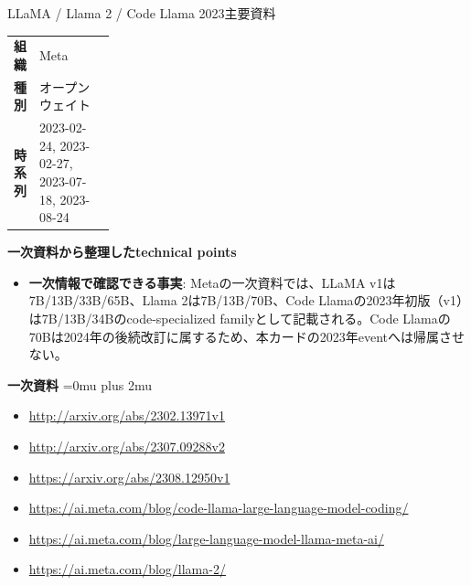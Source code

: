\begin{technicalnote}{LLaMA / Llama 2 / Code Llama 2023}{主要資料}
\begingroup
\begin{tabularx}{\linewidth}{@{}>{\bfseries}p{0.22\linewidth}X@{}}
組織 & Meta \\
種別 & オープンウェイト \\
時系列 & 2023-02-24, 2023-02-27, 2023-07-18, 2023-08-24 \\
\end{tabularx}
\smallskip
{\bfseries 一次資料から整理したtechnical points}
\begin{itemize}[leftmargin=1.5em,itemsep=0.35em]
\item \textbf{一次情報で確認できる事実}: Metaの一次資料では、LLaMA v1は7B/13B/33B/65B、Llama 2は7B/13B/70B、Code Llamaの2023年初版（v1）は7B/13B/34Bのcode-specialized familyとして記載される。Code Llamaの70Bは2024年の後続改訂に属するため、本カードの2023年eventへは帰属させない。
\end{itemize}
\begin{minipage}{\linewidth}
\begin{samepage}
{\bfseries 一次資料}
\begingroup\sloppy
\Urlmuskip=0mu plus 2mu\relax
\begin{itemize}[leftmargin=1.5em,itemsep=0.25em]
\item {\scriptsize\url{http://arxiv.org/abs/2302.13971v1}}
\item {\scriptsize\url{http://arxiv.org/abs/2307.09288v2}}
\item {\scriptsize\url{https://arxiv.org/abs/2308.12950v1}}
\item {\scriptsize\url{https://ai.meta.com/blog/code-llama-large-language-model-coding/}}
\item {\scriptsize\url{https://ai.meta.com/blog/large-language-model-llama-meta-ai/}}
\item {\scriptsize\url{https://ai.meta.com/blog/llama-2/}}
\end{itemize}
\endgroup
\end{samepage}
\end{minipage}
\endgroup
\end{technicalnote}
\medskip

